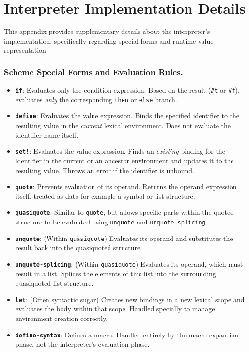 \documentclass[final]{cmpreport_02}
\begin{document}
\section{Interpreter Implementation Details}
\label{app:interpreter-details}

This appendix provides supplementary details about the interpreter's implementation, specifically regarding special forms and runtime value representation.

\subsubsection*{Scheme Special Forms and Evaluation Rules.}
\label{tab:special-forms-appendix}
\begin{itemize}
    \item \textbf{\texttt{if}}: Evaluates only the condition expression. Based on the result (\texttt{\#t} or \texttt{\#f}), evaluates \emph{only} the corresponding \texttt{then} or \texttt{else} branch.
    \item \textbf{\texttt{define}}: Evaluates the value expression. Binds the specified identifier to the resulting value in the \emph{current} lexical environment. Does not evaluate the identifier name itself.
    \item \textbf{\texttt{set!}}: Evaluates the value expression. Finds an \emph{existing} binding for the identifier in the current or an ancestor environment and updates it to the resulting value. Throws an error if the identifier is unbound.
    \item \textbf{\texttt{quote}}: Prevents evaluation of its operand. Returns the operand expression itself, treated as data for example a symbol or list structure.
    \item \textbf{\texttt{quasiquote}}: Similar to \texttt{quote}, but allows specific parts within the quoted structure to be evaluated using \texttt{unquote} and \texttt{unquote-splicing}.
    \item \textbf{\texttt{unquote}}: (Within \texttt{quasiquote}) Evaluates its operand and substitutes the result back into the quasiquoted structure.
    \item \textbf{\texttt{unquote-splicing}}: (Within \texttt{quasiquote}) Evaluates its operand, which must result in a list. Splices the elements of this list into the surrounding quasiquoted list structure.
    \item \textbf{\texttt{let}}: (Often syntactic sugar) Creates new bindings in a new lexical scope and evaluates the body within that scope. Handled specially to manage environment creation correctly.
    \item \textbf{\texttt{define-syntax}}: Defines a macro. Handled entirely by the macro expansion phase, not the interpreter's evaluation phase.
\end{itemize}
\end{document}
